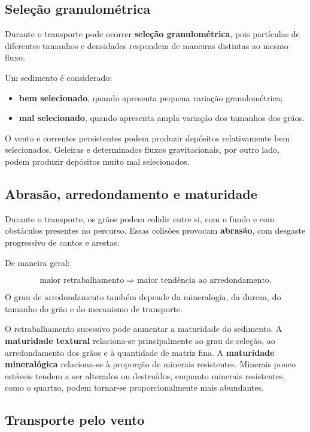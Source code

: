 \documentclass[a4paper,12pt]{article}
\theoremstyle{definition}
\theoremstyle{definition}
\theoremstyle{definition}
\begin{document}
\subsection{Seleção granulométrica}

Durante o transporte pode ocorrer \textbf{seleção granulométrica}, pois partículas
de diferentes tamanhos e densidades respondem de maneiras distintas ao mesmo
fluxo.

Um sedimento é considerado:

\begin{itemize}
    \item \textbf{bem selecionado}, quando apresenta pequena variação granulométrica;
    \item \textbf{mal selecionado}, quando apresenta ampla variação dos tamanhos dos grãos.
\end{itemize}

O vento e correntes persistentes podem produzir depósitos relativamente bem
selecionados. Geleiras e determinados fluxos gravitacionais, por outro lado,
podem produzir depósitos muito mal selecionados.

\subsection{Abrasão, arredondamento e maturidade}

Durante o transporte, os grãos podem colidir entre si, com o fundo e com
obstáculos presentes no percurso. Essas colisões provocam \textbf{abrasão}, com
desgaste progressivo de cantos e arestas.

De maneira geral:

\[
\text{maior retrabalhamento}
\Rightarrow
\text{maior tendência ao arredondamento}.
\]

O grau de arredondamento também depende da mineralogia, da dureza, do tamanho do
grão e do mecanismo de transporte.

O retrabalhamento sucessivo pode aumentar a maturidade do sedimento. A
\textbf{maturidade textural} relaciona-se principalmente ao grau de seleção, ao
arredondamento dos grãos e à quantidade de matriz fina. A
\textbf{maturidade mineralógica} relaciona-se à proporção de minerais
resistentes. Minerais pouco estáveis tendem a ser alterados ou destruídos,
enquanto minerais resistentes, como o quartzo, podem tornar-se
proporcionalmente mais abundantes.

\subsection{Transporte pelo vento}
\end{document}
